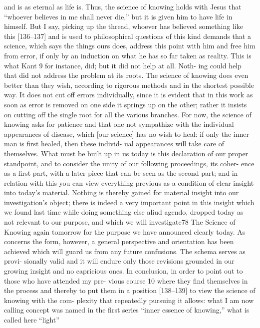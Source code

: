 and is as eternal as life is.
 Thus, the science of knowing holds with Jesus that
“whoever believes in me shall never die,” but it is given him to have life in
himself.
 But I say, picking up the thread, whoever has believed something like
this [136–137] and is used to philosophical questions of this kind demands
that a science, which says the things ours does, address this point with him
and free him from error, if only by an induction on what he has so far taken
as reality.
 This is what Kant 9 for instance, did; but it did not help at all.
 Noth-
ing could help that did not address the problem at its roots.
 The science of
knowing does even better than they wish, according to rigorous methods and
in the shortest possible way.
 It does not cut off errors individually, since it is
evident that in this work as soon as error is removed on one side it springs up
on the other; rather it insists on cutting off the single root for all the various
branches.
 For now, the science of knowing asks for patience and that one not
sympathize with the individual appearances of disease, which [our science]
has no wish to heal: if only the inner man is first healed, then these individ-
ual appearances will take care of themselves.
What must be built up in us today is this declaration of our proper
standpoint, and to consider the unity of our following proceedings, its coher-
ence as a first part, with a later piece that can be seen as the second part; and
in relation with this you can view everything previous as a condition of clear
insight into today’s material.
 Nothing is thereby gained for material insight
into our investigation’s object; there is indeed a very important point in this
insight which we found last time while doing something else {aliud agendo},
dropped today as not relevant to our purpose, and which we will investigate78
The Science of Knowing
again tomorrow for the purpose we have announced clearly today.
 As concerns
the form, however, a general perspective and orientation has been achieved
which will guard us from any future confusions.
 The schema serves as provi-
sionally valid and it will endure only those revisions grounded in our growing
insight and no capricious ones.
In conclusion, in order to point out to those who have attended my pre-
vious course 10 where they find themselves in the process and thereby to put
them in a position [138–139] to view the science of knowing with the com-
plexity that repeatedly pursuing it allows: what I am now calling concept was
named in the first series “inner essence of knowing,” what is called here “light”
